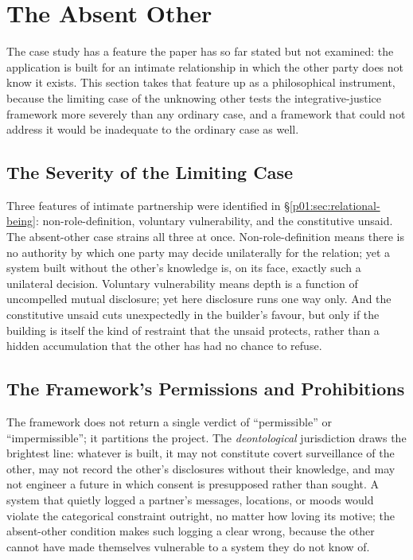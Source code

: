 \documentclass[11pt,a4paper]{article}
\begin{document}
\section{The Absent Other}\label{p01:sec:absent-other}

The case study has a feature the paper has so far stated but not examined: the application is built for an intimate relationship in which the other party does not know it exists. This section takes that feature up as a philosophical instrument, because the limiting case of the unknowing other tests the integrative-justice framework more severely than any ordinary case, and a framework that could not address it would be inadequate to the ordinary case as well.

\subsection{The Severity of the Limiting Case}

Three features of intimate partnership were identified in §\ref{p01:sec:relational-being}: non-role-definition, voluntary vulnerability, and the constitutive unsaid. The absent-other case strains all three at once. Non-role-definition means there is no authority by which one party may decide unilaterally for the relation; yet a system built without the other's knowledge is, on its face, exactly such a unilateral decision. Voluntary vulnerability means depth is a function of uncompelled mutual disclosure; yet here disclosure runs one way only. And the constitutive unsaid cuts unexpectedly in the builder's favour, but only if the building is itself the kind of restraint that the unsaid protects, rather than a hidden accumulation that the other has had no chance to refuse.

\subsection{The Framework's Permissions and Prohibitions}

The framework does not return a single verdict of ``permissible'' or ``impermissible''; it partitions the project. The \emph{deontological} jurisdiction draws the brightest line: whatever is built, it may not constitute covert surveillance of the other, may not record the other's disclosures without their knowledge, and may not engineer a future in which consent is presupposed rather than sought. A system that quietly logged a partner's messages, locations, or moods would violate the categorical constraint outright, no matter how loving its motive; the absent-other condition makes such logging a clear wrong, because the other cannot have made themselves vulnerable to a system they do not know of.
\end{document}
